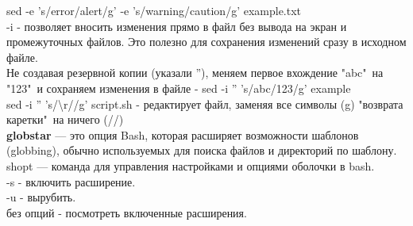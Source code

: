 sed -e 's/error/alert/g' -e 's/warning/caution/g' example.txt \\
-i - позволяет вносить изменения прямо в файл без вывода на экран и промежуточных файлов. Это полезно для сохранения изменений сразу в исходном файле. \\
Не создавая резервной копии (указали ''), меняем первое вхождение "abc"\, на "123"\, и сохраняем изменения в файле - sed -i '' 's/abc/123/g' example \\
sed -i '' 's/\textbackslash r//g' script.sh - редактирует файл, заменяя все символы (g) "возврата каретки"\, на ничего (//) \\

\noindent \textbf{globstar} — это опция Bash, которая расширяет возможности шаблонов (globbing), обычно используемых для поиска файлов и директорий по шаблону. \\
shopt — команда для управления настройками и опциями оболочки в bash. \\
-s - включить расширение. \\
-u - вырубить. \\
без опций - посмотреть включенные расширения.

